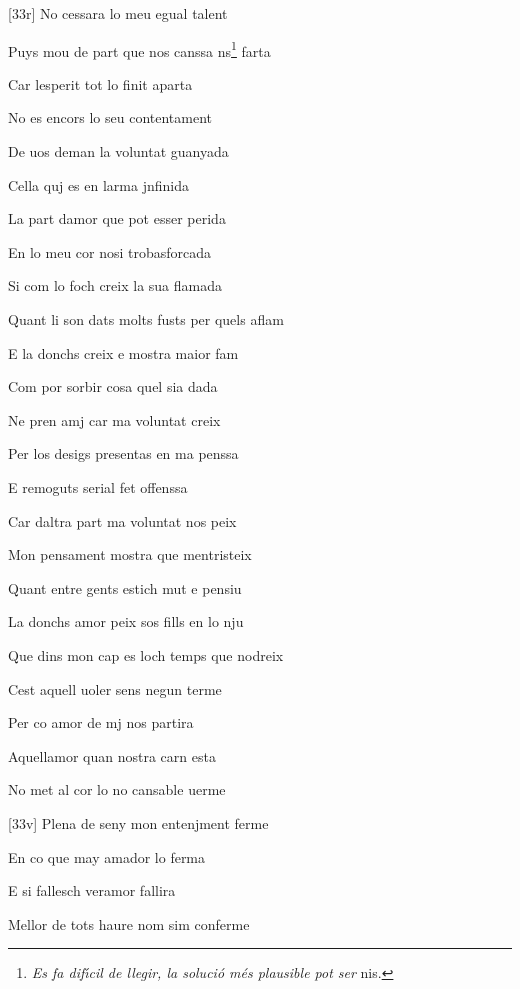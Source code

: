 \documentclass[12pt]{article}
\begin{document}
\begin{estrofa}

 [33r] No cessara lo meu egual talent

 Puys mou de part que nos canssa ns\footnote{\textit{Es fa dif\'{\i}cil de
llegir, la soluci\'{o} m\'{e}s plausible pot ser} nis.} farta

 Car lesperit tot lo finit aparta

 No es encors lo seu contentament

 De uos deman la voluntat guanyada

 Cella quj es en larma jnfinida

 La part damor que pot esser perida

 En lo meu cor nosi trobasforcada

\end{estrofa}



\begin{estrofa}

 Si com lo foch creix la sua flamada

 Quant li son dats molts fusts per quels aflam

 E la donchs creix e mostra maior fam

 Com por sorbir cosa quel sia dada

 Ne pren amj car ma voluntat creix

 Per los desigs presentas en ma penssa

 E remoguts serial fet offenssa

 Car daltra part ma voluntat nos peix

\end{estrofa}



\begin{estrofa}

 Mon pensament mostra que mentristeix

 Quant entre gents estich mut e pensiu

 La donchs amor peix sos fills en lo nju

 Que dins mon cap es loch temps que nodreix

 Cest  aquell uoler sens negun terme

 Per co amor de mj nos partira

 Aquellamor quan nostra carn esta

 No met al cor lo no cansable uerme

\end{estrofa}



\begin{estrofa}

 [33v] Plena de seny mon entenjment ferme

 En co que may amador lo ferma

 E si fallesch veramor fallira

 Mellor de tots haure nom sim conferme

\end{estrofa}
\end{document}
